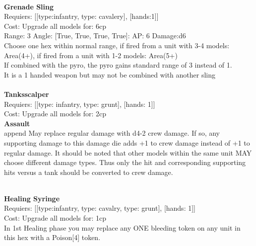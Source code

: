 \ \\
{\bf Grenade Sling } \\

Requiers: [[type:infantry, type: cavalery], [hands:1]] \\
Cost: Upgrade all models for: 6cp \\


Range: 3  Angle: [True, True, True, True]: AP: 6 Damage:d6 \\
Choose one hex within normal range, if fired from a unit with 3-4 models: Area(4+), if fired from a unit with 1-2 models: Area(5+)\\ 
If combined with the pyro, the pyro gains standard range of 3 instead of 1.\\ 
It is a 1 handed weapon but may not be combined with another sling\\ 








\ \\
{\bf Tanksscalper } \\

Requiers: [[type: infantry, type: grunt], [hands: 1]] \\
Cost: Upgrade all models for: 2cp \\




{\bf Assault} \ \\

append May replace regular damage with d4-2 crew damage. If so, any supporting damage to this damage die adds +1 to crew damage instead of +1 to regular damage. It should be noted that other models within the same unit MAY choose different damage types. Thus only the hit and corresponding supporting hits versus a tank should be converted to crew damage.


\ \\
{\bf Healing Syringe } \\

Requiers: [[type:infantry, type: cavalry, type: grunt], [hands: 1]] \\
Cost: Upgrade all models for: 1cp \\
In 1st Healing phase you may replace any ONE bleeding token on any unit in this hex with a Poison[4] token.\\ 









